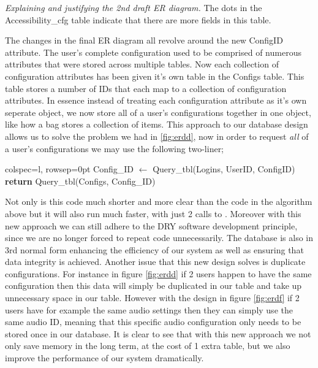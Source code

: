\textit{Explaining and justifying the 2nd draft ER diagram.}
The dots in the {\sffamily Accessibility\_cfg} table indicate
that there are more fields in this table. \\ \vspace{0.2cm}

The changes in the final ER diagram all revolve around the new
ConfigID attribute. The user's complete configuration used to 
be comprised of numerous attributes that were stored across
multiple tables. Now each collection of configuration
attributes has been given it's own table in the
{\sffamily Configs} table. This table stores a number of IDs
that each map to a collection of configuration attributes.
In essence instead of treating each configuration attribute as
it's own seperate object, we now store all of a user's 
configurations together in one object, like how a bag stores
a collection of items. This approach to our database design
allows us to solve the problem we had in \ref{fig:erdd}, now
in order to request \textit{all} of a user's configurations
we may use the following two-liner;\\

\begin{center}
\begin{tblr}{colspec={l}, rowsep=0pt}
  {\sffamily Config\_ID} $\gets$ {\sffamily Query\_tbl(Logins, UserID, ConfigID)}\\
  {\sffamily \textbf{return} Query\_tbl(Configs, Config\_ID)}\\
\end{tblr}
\end{center}

Not only is this code much shorter and more clear than the 
code in the algorithm above but it will also run much
faster, with just 2 calls to . Moreover
with this new approach we can still adhere to the DRY software
development principle, since we are no longer forced to repeat
code unnecessarily. The database is also in 3rd normal form
enhancing the efficiency of our system as 
well as ensuring that data integrity is achieved.
Another issue that this new design solves
is duplicate configurations. For instance in figure 
\ref{fig:erdd} if 2 users happen to have the same
configuration then this data will simply be duplicated in our 
table and take up unnecessary space in our table. However 
with the design in figure \ref{fig:erdf} if 2 users have for
example the same audio settings then they can simply use the
same audio ID, meaning that this specific audio configuration 
only needs to be stored once in our database. It is clear to 
see that with this new approach we not only save memory in 
the long term, at the cost of 1 extra table, but we also 
improve the performance of our system dramatically. \\
\vspace{0.2cm}

